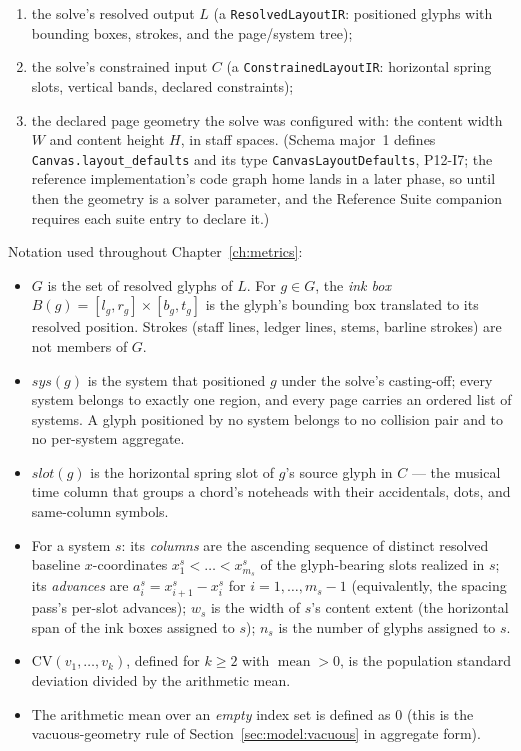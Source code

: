 \documentclass[11pt,letterpaper]{report}
\begin{document}
\begin{enumerate}
  \item the solve's resolved output $L$ (a \texttt{ResolvedLayoutIR}:
    positioned glyphs with bounding boxes, strokes, and the page/system
    tree);
  \item the solve's constrained input $C$ (a \texttt{ConstrainedLayoutIR}:
    horizontal spring slots, vertical bands, declared constraints);
  \item the declared page geometry the solve was configured with: the
    content width $W$ and content height $H$, in staff spaces. (Schema
    major~1 defines \texttt{Canvas.layout\_defaults} and its type
    \texttt{CanvasLayoutDefaults}, P12-I7; the reference implementation's
    code graph home lands in a later phase, so until then the geometry is a
    solver parameter, and the Reference Suite companion requires each suite
    entry to declare it.)
\end{enumerate}

Notation used throughout Chapter~\ref{ch:metrics}:

\begin{itemize}
  \item $G$ is the set of resolved glyphs of $L$. For $g \in G$, the
    \emph{ink box} $B(g) = [l_g, r_g] \times [b_g, t_g]$ is the glyph's
    bounding box translated to its resolved position. Strokes (staff
    lines, ledger lines, stems, barline strokes) are not members of $G$.
  \item $\mathit{sys}(g)$ is the system that positioned $g$ under the
    solve's casting-off; every system belongs to exactly one region, and
    every page carries an ordered list of systems. A glyph positioned by
    no system belongs to no collision pair and to no per-system
    aggregate.
  \item $\mathit{slot}(g)$ is the horizontal spring slot of $g$'s source
    glyph in $C$ --- the musical time column that groups a chord's
    noteheads with their accidentals, dots, and same-column symbols.
  \item For a system $s$: its \emph{columns} are the ascending sequence of
    distinct resolved baseline $x$-coordinates
    $x^s_1 < \dots < x^s_{m_s}$ of the glyph-bearing slots realized in
    $s$; its \emph{advances} are $a^s_i = x^s_{i+1} - x^s_i$ for
    $i = 1, \dots, m_s - 1$ (equivalently, the spacing pass's per-slot
    advances); $w_s$ is the width of $s$'s content extent (the horizontal
    span of the ink boxes assigned to $s$); $n_s$ is the number of glyphs
    assigned to $s$.
  \item $\mathrm{CV}(v_1, \dots, v_k)$, defined for $k \ge 2$ with
    $\operatorname{mean} > 0$, is the population standard deviation
    divided by the arithmetic mean.
  \item The arithmetic mean over an \emph{empty} index set is defined as
    $0$ (this is the vacuous-geometry rule of
    Section~\ref{sec:model:vacuous} in aggregate form).
\end{itemize}
\end{document}
